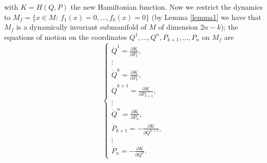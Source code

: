 \documentclass[10pt,a4paper]{article}
\begin{document}
with $K=H(Q,P)$ the new Hamiltonian function. Now we restrict the dynamics to $M_{f}=\lbrace x\in M: \ f_{1}(x)=0, \ldots,f_{k}(x)=0\rbrace$ (by Lemma \ref{lemma1} we have that $M_{f}$ is a dynamically invariant submanifold of $M$ of dimension $2n-k$); the equations of motion on the coordinates $Q^{1},\ldots,Q^{n},P_{k+1},\ldots,P_{n}$ on $M_{f}$ are
\begin{equation}
\label{reducedsystem}
\left\lbrace \begin{array}{c}
\dot{Q}^{1}= \frac{\partial K}{\partial P_{1}},\\ 
\vdots \\ 
\dot{Q}^{k}= \frac{\partial K}{\partial P_{k}},\\ 
\dot{Q}^{k+1}= \frac{\partial K}{\partial P_{k+1}},\\
\vdots\\
\dot{Q}^{n}= \frac{\partial K}{\partial P_{n}},\\ 
\dot{P}_{k+1}= -\frac{\partial K}{\partial Q^{k+1}},\\
\vdots\\
\dot{P}_{n}= -\frac{\partial K}{\partial Q^{n}}.
\end{array} \right.
\end{equation}
\end{document}
